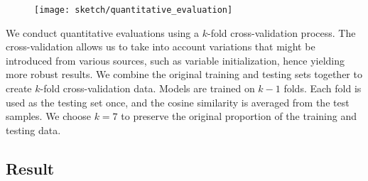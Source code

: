 \begin{figure}[!htb]
\centering
\texttt{[image: sketch/quantitative\_evaluation]}
\label{fig:quantitative_evaluation}
\end{figure}

We conduct quantitative evaluations using a $k$-fold cross-validation process. The cross-validation allows us to take into account variations that might be introduced from various sources, such as variable initialization, hence yielding more robust results. We combine the original training and testing sets together to create $k$-fold cross-validation data. Models are trained on $k-1$ folds. Each fold is used as the testing set once, and the cosine similarity is averaged from the test samples.  We choose $k=7$ to preserve the original proportion of the training and testing data.








\subsection{Result}

